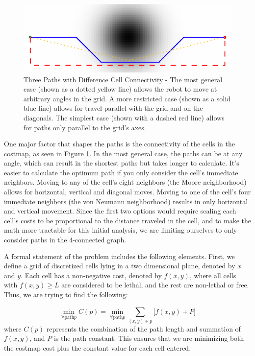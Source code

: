 \begin{figure}
\includegraphics[width=\columnwidth]{graphix/connectedness.png}
\caption{Three Paths with Difference Cell Connectivity - The most general case (shown as a dotted yellow line) allows the robot to move at arbitrary angles in the grid. A more restricted case (shown as a solid blue line) allows for travel parallel with the grid and on the diagonals. The simplest case (shown with a dashed red line) allows for paths only parallel to the grid's axes. }
\label{fig:connectedness}
\end{figure}

One major factor that shapes the paths is the connectivity of the cells in the costmap, as seen in Figure \ref{fig:connectedness}. In the most general case, the paths can be at any angle, which can result in the shortest paths but takes longer to calculate. It's easier to calculate the optimum path if you only consider the cell's immediate neighbors. Moving to any of the cell's eight neighbors (the Moore neighborhood) allows for horizontal, vertical and diagonal moves. Moving to one of the cell's four immediate neighbors (the von Neumann neighborhood) results in only horizontal and vertical movement. Since the first two options would require scaling each cell's costs to be proportional to the distance traveled in the cell, and to make the math more tractable for this initial analysis, we are limiting ourselves to only consider paths in the 4-connected graph. 

A formal statement of the problem includes the following elements. First, we define a grid of discretized cells lying in a two dimensional plane, denoted by $x$ and $y$. Each cell has a non-negative cost, denoted by $f(x,y)$, where all cells with $f(x,y)\ge L$ are considered to be lethal, and the rest are non-lethal or free. Thus, we are trying to find the following:

\[ \min_{\forall \mathrm{path} p} C(p) = \min_{\forall \mathrm{path} p} \sum\limits_{(x,y) \in p}^{} \Big[ f(x,y) + P \Big] \]
where $C(p)$ represents the combination of the path length and summation of $f(x,y)$, and $P$ is the path constant. This ensures that we are minimizing both the costmap cost plus the constant value for each cell entered.


